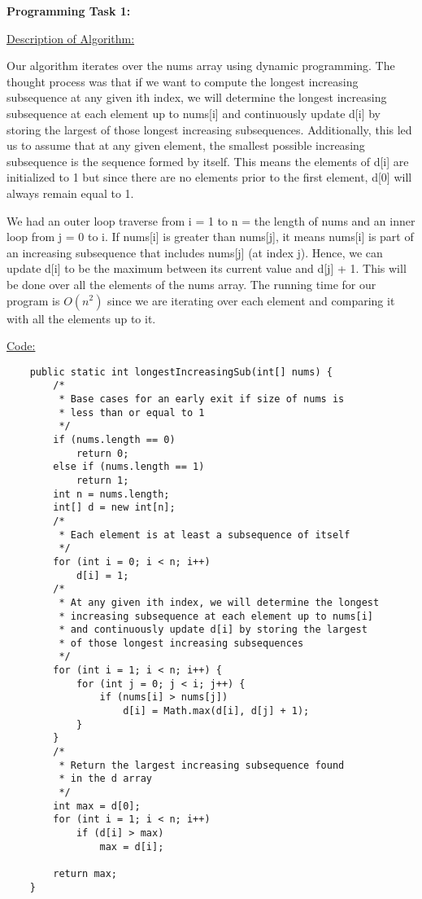 \documentclass[12pt,letterpaper,final]{report}
\begin{document}
\bigskip


\noindent\textbf{Programming Task 1:} 

\medskip

\underline{Description of Algorithm:}
\medskip

Our algorithm iterates over the nums array using dynamic programming. The thought process was that if we want to compute the longest increasing subsequence at any given ith index, we will determine the longest increasing subsequence at each element up to nums[i] and continuously update d[i] by storing the largest of those longest increasing subsequences. Additionally, this led us to assume that at any given element, the smallest possible increasing subsequence is the sequence formed by itself. This means the elements of d[i] are initialized to 1 but since there are no elements prior to the first element, d[0] will always remain equal to 1.

We had an outer loop traverse from i = 1 to n = the length of nums and an inner loop from j = 0 to i. If nums[i] is greater than nums[j], it means nums[i] is part of an increasing subsequence that includes nums[j] (at index j). Hence, we can update d[i] to be the maximum between its current value and d[j] + 1. This will be done over all the elements of the nums array. The running time for our program is $O(n^2)$ since we are iterating over each element and comparing it with all the elements up to it. 

\bigskip

\underline{Code:}
\lstset{language=Java}
\begin{lstlisting}
    public static int longestIncreasingSub(int[] nums) {
        /*
         * Base cases for an early exit if size of nums is 
         * less than or equal to 1
         */
        if (nums.length == 0)
            return 0;
        else if (nums.length == 1)
            return 1;
        int n = nums.length;
        int[] d = new int[n];
        /*
         * Each element is at least a subsequence of itself
         */
        for (int i = 0; i < n; i++)
            d[i] = 1;
        /* 
         * At any given ith index, we will determine the longest
         * increasing subsequence at each element up to nums[i]
         * and continuously update d[i] by storing the largest
         * of those longest increasing subsequences
         */
        for (int i = 1; i < n; i++) {
            for (int j = 0; j < i; j++) {
                if (nums[i] > nums[j]) 
                    d[i] = Math.max(d[i], d[j] + 1);
            }
        }
        /*
         * Return the largest increasing subsequence found
         * in the d array 
         */
        int max = d[0];
        for (int i = 1; i < n; i++)
            if (d[i] > max)
                max = d[i];

        return max;
    }
    
\end{lstlisting}
\bigskip
\end{document}
